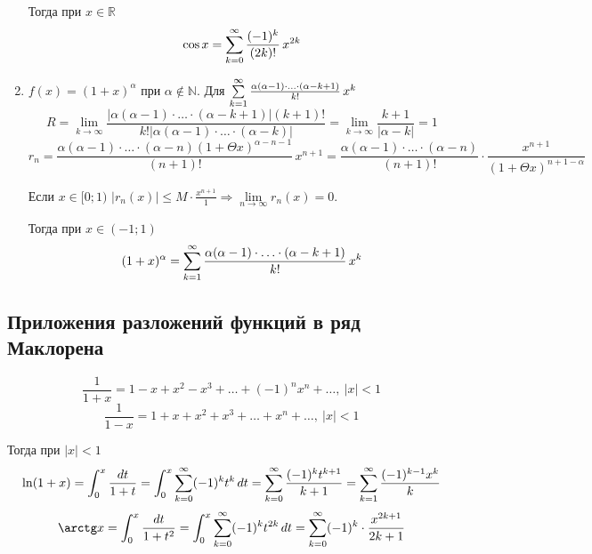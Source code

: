 \begin{enumerate}
	Тогда при $x \in \mathbb R$
	\begin{equation*}
	\cos x = \series[0] \frac{(-1)^k}{(2k)!}\,x^{2k}
	\end{equation*}
	
	\item $f(x) = (1 + x)^\alpha$ при $\alpha \notin \mathbb N$.
	Для $\series \frac{\alpha (\alpha - 1) \cdot \ldots \cdot (\alpha - k + 1)}{k!}\,x^k$
	\begin{equation*}
	R = \lim_{k \to \infty} \frac
	{|\alpha (\alpha - 1) \cdot \ldots \cdot (\alpha - k + 1)| (k + 1)!}
	{k! |\alpha (\alpha - 1) \cdot \ldots \cdot (\alpha - k)|} =
	\lim_{k \to \infty} \frac{k + 1}{|\alpha - k|} = 1
	\end{equation*}
	\begin{equation*}
	r_n = \frac{\alpha (\alpha - 1) \cdot \ldots \cdot (\alpha - n) (1 + \Theta x)^{\alpha-n-1}}{(n + 1)!}\,x^{n+1} =
	\frac{\alpha (\alpha - 1) \cdot \ldots \cdot (\alpha - n)}{(n + 1)!} \cdot
	\frac{x^{n+1}}{(1 + \Theta x)^{n+1-\alpha}}
	\end{equation*}
	
	Если $x \in [0; 1)$ $|r_n(x)| \leqslant M \cdot \frac{x^{n+1}}1 \Rightarrow \lim\limits_{n \to \infty} r_n(x) = 0$.
	
	Тогда при $x \in (-1; 1)$
	\begin{equation*}
	(1 + x)^\alpha = \series \frac{\alpha (\alpha - 1) \cdot \ldots \cdot (\alpha - k + 1)}{k!}\,x^k
	\end{equation*}
\end{enumerate}

\subsection{Приложения разложений функций в ряд Маклорена}
\begin{equation*}
\frac1{1 + x} = 1 - x + x^2 - x^3 + \ldots + (-1)^n x^n + \ldots, \ |x| < 1
\end{equation*}
\begin{equation*}
\frac1{1 - x} = 1 + x + x^2 + x^3 + \ldots + x^n + \ldots, \ |x| < 1
\end{equation*}

Тогда при $|x| < 1$
\begin{equation*}
\ln (1 + x) =
\int_0^x \frac{dt}{1 + t} =
\int_0^x \series[0] (-1)^k t^k\,dt =
\series[0] \frac{(-1)^k t^{k+1}}{k + 1} =
\series \frac{(-1)^{k-1} x^k}{k}
\end{equation*}
\begin{equation*}
\arctg x =
\int_0^x \frac{dt}{1 + t^2} =
\int_0^x \series[0] (-1)^k t^{2k}\,dt =
\series[0] (-1)^k \cdot \frac{x^{2k+1}}{2k + 1}
\end{equation*}

